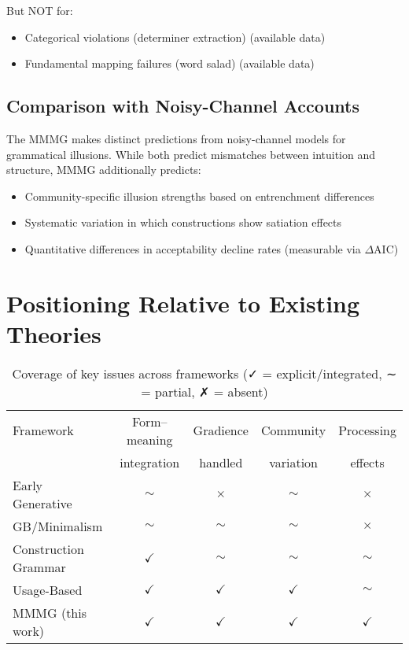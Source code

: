 \documentclass[12pt]{article}
\begin{document}
But NOT for:
\begin{itemize}
\item Categorical violations (determiner extraction) (available data)
\item Fundamental mapping failures (word salad) (available data)
\end{itemize}

\subsection{Comparison with Noisy-Channel Accounts}

The MMMG makes distinct predictions from noisy-channel models \parencite{gibson2013} for grammatical illusions. While both predict mismatches between intuition and structure, MMMG additionally predicts:
\begin{itemize}
\item Community-specific illusion strengths based on entrenchment differences
\item Systematic variation in which constructions show satiation effects
\item Quantitative differences in acceptability decline rates (measurable via $\Delta \text{AIC}$)
\end{itemize}

\section{Positioning Relative to Existing Theories}

\begin{table}[h]
\centering
\small
\caption{Coverage of key issues across frameworks (✓ = explicit/integrated, ∼ = partial, ✗ = absent)}
\begin{tabular}{@{}lcccc@{}}
\toprule
Framework & Form–meaning & Gradience & Community & Processing \\
          & integration  & handled   & variation & effects \\
\midrule
Early Generative     & $\sim$ & $\times$ & $\sim$ & $\times$ \\
GB/Minimalism        & $\sim$ & $\sim$   & $\sim$ & $\times$ \\
Construction Grammar & $\checkmark$ & $\sim$ & $\sim$ & $\sim$ \\
Usage-Based          & $\checkmark$ & $\checkmark$ & $\checkmark$ & $\sim$ \\
MMMG (this work)     & $\checkmark$ & $\checkmark$ & $\checkmark$ & $\checkmark$ \\
\bottomrule
\end{tabular}
\end{table}
\end{document}
